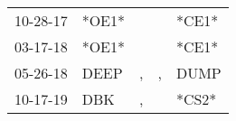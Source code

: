\begin{supertabular}{p{0.07\textwidth}p{0.06\textwidth}p{0.02\textwidth}p{0.02\textwidth}p{0.06\textwidth}}
 10-28-17\textsuperscript{} &                   *OE1* &    &    &                   *CE1* \\
 03-17-18\textsuperscript{} &                   *OE1* &    &    &                   *CE1* \\
 05-26-18\textsuperscript{} &  DEEP\textsuperscript{} &  , &  , &  DUMP\textsuperscript{} \\
 10-17-19\textsuperscript{} &   DBK\textsuperscript{} &  , &    &                   *CS2* \\
\end{supertabular}
